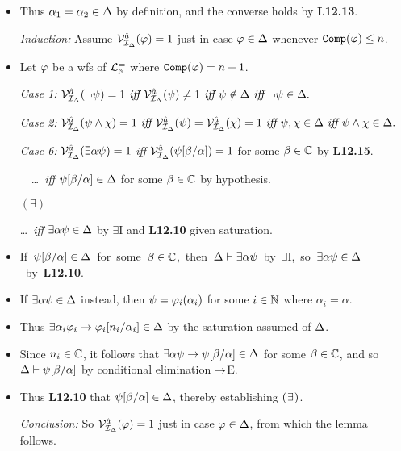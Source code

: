 \documentclass[a4paper, 11pt]{article} %
\begin{document}
\begin{itemize}
  \item Thus $\alpha_1=\alpha_2\in\Delta$ by definition, and the converse holds by \textbf{L12.13}.
  \item[\it Induction:] Assume $\mathcal{V}_{\mathcal{I}_{\Delta}}^{\hat{a}}(\varphi)=1$ just in case $\varphi\in\Delta$ whenever $\texttt{Comp}(\varphi)\leq n$.
    \setcounter{enumi}{0}
  \item Let $\varphi$ be a wfs of $\mathcal{L}^{=}_{\mathbb{N}}$ where $\texttt{Comp}(\varphi)=n+1$.
  \item[\it Case 1:]     
    $ \mathcal{V}_{\mathcal{I}_{\Delta}}^{\hat{a}}(\neg\psi)=1
      \textit{ iff } \mathcal{V}_{\mathcal{I}_{\Delta}}^{\hat{a}}(\psi)\neq 1
      \textit{ iff } \psi\notin\Delta
      \textit{ iff } \neg\psi\in\Delta.$
  \item[\it Case 2:]     
    $ \mathcal{V}_{\mathcal{I}_{\Delta}}^{\hat{a}}(\psi\wedge\chi)=1
      \textit{ iff } \mathcal{V}_{\mathcal{I}_{\Delta}}^{\hat{a}}(\psi)=\mathcal{V}_{\mathcal{I}_{\Delta}}^{\hat{a}}(\chi)=1 
      \textit{ iff } \psi,\chi\in\Delta 
      \textit{ iff } \psi\wedge\chi\in\Delta.$
  \item[\it Case 6:] $\mathcal{V}_{\mathcal{I}_{\Delta}}^{\hat{a}}(\exists \alpha\psi)=1$  \textit{iff} $\mathcal{V}_{\mathcal{I}_{\Delta}}^{\hat{a}}(\psi[\beta/\alpha])=1$ for some $\beta\in\mathbb{C}$ by \textbf{L12.15}.
    \setcounter{enumi}{0}
  \item[] \strut\quad\quad~~\ldots\ \textit{iff} $\psi[\beta/\alpha]\in\Delta$ for some $\beta\in\mathbb{C}$ by hypothesis.
  \item[] $(\exists)$ \strut\quad\ldots\ \textit{iff} $\exists \alpha\psi\in\Delta$ by $\exists$I and \textbf{L12.10} given saturation.  
    \item \mbox{If $\psi[\beta/\alpha]\in\Delta$ for some $\beta\in\mathbb{C}$, then $\Delta\vdash \exists \alpha\psi$ by $\exists$I, so $\exists \alpha\psi\in\Delta$ by \textbf{L12.10}.}
    \item If $\exists \alpha\psi\in\Delta$ instead, then $\psi=\varphi_i(\alpha_i)$ for some $i\in\mathbb{N}$ where $\alpha_i=\alpha$.
    \item Thus $\exists \alpha_i\varphi_i\rightarrow \varphi_i[n_i/\alpha_i]\in\Delta$ by the saturation assumed of $\Delta$.
    \item Since $n_i\in\mathbb{C}$, it follows that $\exists \alpha\psi\rightarrow\psi[\beta/\alpha]\in\Delta$ for some $\beta\in\mathbb{C}$, and so $\Delta\vdash\psi[\beta/\alpha]$ by conditional elimination $\rightarrow$E. 
    \item Thus \textbf{L12.10} that $\psi[\beta/\alpha]\in\Delta$, thereby establishing $(\hspace{.7pt}\exists\hspace{.7pt})$.
  \item[\it Conclusion:] So $\mathcal{V}_{\mathcal{I}_{\Delta}}^{\hat{a}}(\varphi)=1$ just in case $\varphi\in\Delta$, from which the lemma follows.
\end{itemize}
\end{document}

